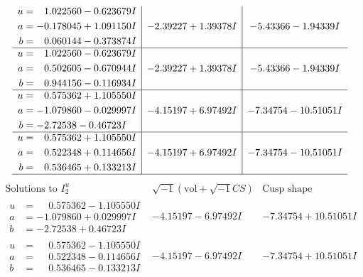 \documentclass[1p]{elsarticle_modified}
\theoremstyle{definition}
\newcommand{\I}{\sqrt{-1}}
\begin{document}
$$\begin{array}{c|c|c}
\begin{aligned}
u &= \phantom{-}1.022560 - 0.623679 I \\
a &= -0.178045 + 1.091150 I \\
b &= \phantom{-}0.060144 - 0.373874 I\end{aligned}
 & -2.39227 + 1.39378 I & -5.43366 - 1.94339 I \\ \hline\begin{aligned}
u &= \phantom{-}1.022560 - 0.623679 I \\
a &= \phantom{-}0.502605 - 0.670944 I \\
b &= \phantom{-}0.944156 - 0.116934 I\end{aligned}
 & -2.39227 + 1.39378 I & -5.43366 - 1.94339 I \\ \hline\begin{aligned}
u &= \phantom{-}0.575362 + 1.105550 I \\
a &= -1.079860 - 0.029997 I \\
b &= -2.72538 - 0.46723 I\end{aligned}
 & -4.15197 + 6.97492 I & -7.34754 - 10.51051 I \\ \hline\begin{aligned}
u &= \phantom{-}0.575362 + 1.105550 I \\
a &= \phantom{-}0.522348 + 0.114656 I \\
b &= \phantom{-}0.536465 + 0.133213 I\end{aligned}
 & -4.15197 + 6.97492 I & -7.34754 - 10.51051 I\\
 \hline 
 \end{array}$$\newpage$$\begin{array}{c|c|c}  
\text{Solutions to }I^u_{2}& \I (\text{vol} + \sqrt{-1}CS) & \text{Cusp shape}\\
 \hline 
\begin{aligned}
u &= \phantom{-}0.575362 - 1.105550 I \\
a &= -1.079860 + 0.029997 I \\
b &= -2.72538 + 0.46723 I\end{aligned}
 & -4.15197 - 6.97492 I & -7.34754 + 10.51051 I \\ \hline\begin{aligned}
u &= \phantom{-}0.575362 - 1.105550 I \\
a &= \phantom{-}0.522348 - 0.114656 I \\
b &= \phantom{-}0.536465 - 0.133213 I\end{aligned}
 & -4.15197 - 6.97492 I & -7.34754 + 10.51051 I \\ \hline\begin{aligned}

\end{aligned}
\end{array}$$
\end{document}
